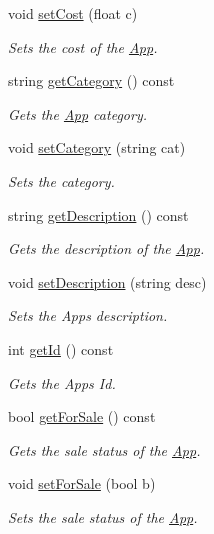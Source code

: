 \begin{DoxyCompactItemize}
void \hyperlink{class_app_a388b33b55bfb1c44ddaf8142f6164477}{set\-Cost} (float c)
\begin{DoxyCompactList}\small\item\em Sets the cost of the \hyperlink{class_app}{App}. \end{DoxyCompactList}\item 
string \hyperlink{class_app_aaca45decd05fd41da9317b5e9f5add7b}{get\-Category} () const 
\begin{DoxyCompactList}\small\item\em Gets the \hyperlink{class_app}{App} category. \end{DoxyCompactList}\item 
void \hyperlink{class_app_a361a6aa87af3a81d500a3d8f67b6940c}{set\-Category} (string cat)
\begin{DoxyCompactList}\small\item\em Sets the category. \end{DoxyCompactList}\item 
string \hyperlink{class_app_acbd6cc03ee6fe958227ea45344e078b0}{get\-Description} () const 
\begin{DoxyCompactList}\small\item\em Gets the description of the \hyperlink{class_app}{App}. \end{DoxyCompactList}\item 
void \hyperlink{class_app_a24d1eb228d32fef3d98e92a66970cfa2}{set\-Description} (string desc)
\begin{DoxyCompactList}\small\item\em Sets the Apps description. \end{DoxyCompactList}\item 
int \hyperlink{class_app_a3c036f3037aa6a9eac6d2bcdbffdb0c2}{get\-Id} () const 
\begin{DoxyCompactList}\small\item\em Gets the Apps Id. \end{DoxyCompactList}\item 
bool \hyperlink{class_app_a865521e2beed7cd13d036af5ac29a703}{get\-For\-Sale} () const 
\begin{DoxyCompactList}\small\item\em Gets the sale status of the \hyperlink{class_app}{App}. \end{DoxyCompactList}\item 
void \hyperlink{class_app_a63a422b19431fe206619be2090d6180a}{set\-For\-Sale} (bool b)
\begin{DoxyCompactList}\small\item\em Sets the sale status of the \hyperlink{class_app}{App}. \end{DoxyCompactList}\item 

\end{DoxyCompactItemize}
